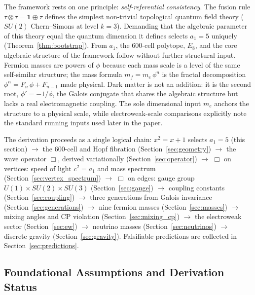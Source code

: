 \documentclass[12pt,a4paper]{article}
\theoremstyle{definition}
\begin{document}
The framework rests on one principle: \emph{self-referential consistency}.  The fusion rule $\tau \otimes \tau = \mathbf{1} \oplus \tau$ defines the simplest non-trivial topological quantum field theory ($SU(2)$ Chern--Simons at level $k = 3$).  Demanding that the algebraic parameter of this theory equal the quantum dimension it defines selects $a_1 = 5$ uniquely (Theorem~\ref{thm:bootstrap}).  From $a_1$, the 600-cell polytope, $E_8$, and the core algebraic structure of the framework follow without further structural input.  Fermion masses are powers of $\phi$ because each mass scale is a level of the same self-similar structure; the mass formula $m_f = m_e\,\phi^n$ is the fractal decomposition $\phi^n = F_n\,\phi + F_{n-1}$ made physical.  Dark matter is not an addition: it is the second root, $\phi' = -1/\phi$, the Galois conjugate that shares the algebraic structure but lacks a real electromagnetic coupling.  The sole dimensional input $m_e$ anchors the structure to a physical scale, while electroweak-scale comparisons explicitly note the standard running inputs used later in the paper.

The derivation proceeds as a single logical chain: $x^2 = x + 1$ selects $a_1 = 5$ (this section) $\to$ the 600-cell and Hopf fibration (Section~\ref{sec:geometry}) $\to$ the wave operator $\Box$, derived variationally (Section~\ref{sec:operator}) $\to$ $\Box$ on vertices: speed of light $c^2 = a_1$ and mass spectrum (Section~\ref{sec:vertex_spectrum}) $\to$ $\Box$ on edges: gauge group $U(1) \times SU(2) \times SU(3)$ (Section~\ref{sec:gauge}) $\to$ coupling constants (Section~\ref{sec:coupling}) $\to$ three generations from Galois invariance (Section~\ref{sec:generations}) $\to$ nine fermion masses (Section~\ref{sec:masses}) $\to$ mixing angles and CP violation (Section~\ref{sec:mixing_cp}) $\to$ the electroweak sector (Section~\ref{sec:ew}) $\to$ neutrino masses (Section~\ref{sec:neutrinos}) $\to$ discrete gravity (Section~\ref{sec:gravity}).  Falsifiable predictions are collected in Section~\ref{sec:predictions}.

\subsection{Foundational Assumptions and Derivation Status}
\label{sec:foundations}
\end{document}
